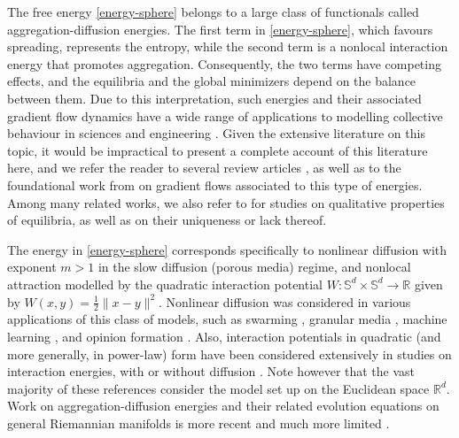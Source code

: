 \documentclass[11pt]{amsart}
\newcommand{\bbr}{\mathbb R}
\newcommand{\bbs}{\mathbb S}
\newcommand{\dm}{d} %
\begin{document}
The free energy \eqref{energy-sphere} belongs to a large class of functionals called aggregation-diffusion energies. The first term in \eqref{energy-sphere}, which favours spreading, represents the entropy, while the second term is a nonlocal interaction energy that promotes aggregation. Consequently, the two terms have competing effects, and the equilibria and the global minimizers depend on the balance between them. Due to this interpretation, such energies and their associated gradient flow dynamics have a wide range of applications to modelling collective behaviour in sciences and engineering \cite{CaMcVi2006, HoPu2005, JiEgerstedt2007, KoSuUmBe2011, LeToBe2009, MotschTadmor2014}. Given the extensive literature on this topic, it would be impractical to present a complete account of this literature here, and we refer the reader to several review  articles \cite{BailoCarrilloCastro2024, CarrilloCraigYao2019, CarrilloVecil2010}, as well as to the foundational work from \cite{AGS2005, CaMcVi2006} on gradient flows associated to this type of energies. Among many related works, we also refer to \cite{BurgerDiFrancescoFranek, BuFeHu14, CaHiVoYa2019, CaHoMaVo2018, DelgadinoXukaiYao2022} for studies on qualitative properties of equilibria, as well as on their uniqueness or lack thereof.

The energy in \eqref{energy-sphere} corresponds specifically to nonlinear diffusion with exponent $m>1$ in the slow diffusion (porous media) regime, and nonlocal attraction modelled by the quadratic interaction potential $W:\bbs^\dm \times \bbs^\dm \to \bbr$ given by $W(x,y) = \frac{1}{2} \| x-y \|^2$. Nonlinear diffusion was considered in various applications of this class of models, such as swarming  \cite{BurgerDiFrancescoFranek, BuFeHu14, Kaib17, TBL}, granular media \cite{CaMcVi2006}, machine learning \cite{PeletierShalova2025}, and opinion formation \cite{FagioliRadici2021}. Also, interaction potentials in quadratic (and more generally, in power-law) form have been considered extensively in studies on interaction energies, with or without diffusion \cite{Balague_etalARMA, BertozziCarilloLaurent,BertozziLaurent,CarrilloChipotHuang2014,CaHoMaVo2018,ChFeTo2015,FeHu13,HoPu2005,LeToBe2009}.  Note however that the vast majority of these references consider the model set up on the Euclidean space $\bbr^\dm$. Work on aggregation-diffusion energies and their related evolution equations on general Riemannian manifolds is more recent and much more limited \cite{CaFePa2025a, FeHaPa2021, FePa2023a, FePa2024b, FePa2024a, HaHwKiKiMi, ha2022emergent, PeletierShalova2025, WuSlepcev2015}. 
\end{document}
